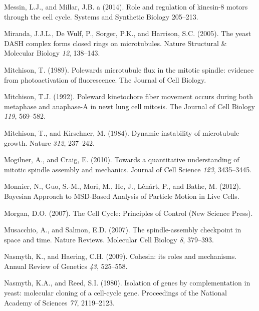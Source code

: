 \documentclass[12pt,a4paper,twoside,openright]{book}
\begin{document}
Messin, L.J., and Millar, J.B. a (2014). Role and regulation of
kinesin-8 motors through the cell cycle. Systems and Synthetic Biology
205--213.

Miranda, J.J.L., De Wulf, P., Sorger, P.K., and Harrison, S.C. (2005).
The yeast DASH complex forms closed rings on microtubules. Nature
Structural \& Molecular Biology \emph{12}, 138--143.

Mitchison, T. (1989). Polewards microtubule flux in the mitotic spindle:
evidence from photoactivation of fluorescence. The Journal of Cell
Biology.

Mitchison, T.J. (1992). Poleward kinetochore fiber movement occurs
during both metaphase and anaphase-A in newt lung cell mitosis. The
Journal of Cell Biology \emph{119}, 569--582.

Mitchison, T., and Kirschner, M. (1984). Dynamic instability of
microtubule growth. Nature \emph{312}, 237--242.

Mogilner, A., and Craig, E. (2010). Towards a quantitative understanding
of mitotic spindle assembly and mechanics. Journal of Cell Science
\emph{123}, 3435--3445.

Monnier, N., Guo, S.-M., Mori, M., He, J., Lénárt, P., and Bathe, M.
(2012). Bayesian Approach to MSD-Based Analysis of Particle Motion in
Live Cells.

Morgan, D.O. (2007). The Cell Cycle: Principles of Control (New Science
Press).

Musacchio, A., and Salmon, E.D. (2007). The spindle-assembly checkpoint
in space and time. Nature Reviews. Molecular Cell Biology \emph{8},
379--393.

Nasmyth, K., and Haering, C.H. (2009). Cohesin: its roles and
mechanisms. Annual Review of Genetics \emph{43}, 525--558.

Nasmyth, K.A., and Reed, S.I. (1980). Isolation of genes by
complementation in yeast: molecular cloning of a cell-cycle gene.
Proceedings of the National Academy of Sciences \emph{77}, 2119--2123.
\end{document}
